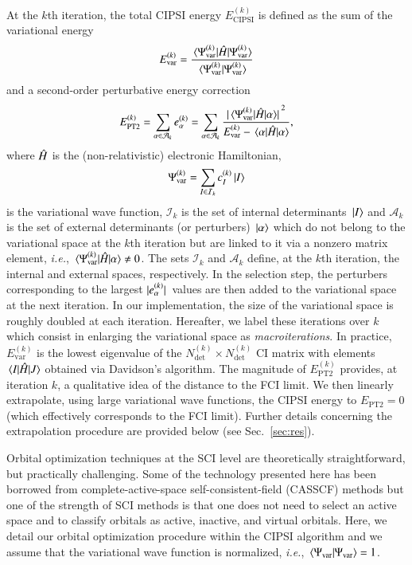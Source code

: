 \documentclass[aip,jcp,reprint,noshowkeys,superscriptaddress,floatfix]{revtex4-1}
\newcommand{\ie}{\textit{i.e.}}
\newcommand{\Ndet}{N_\text{det}}
\newcommand{\hH}{\Hat{H}}
\newcommand{\cA}{\mathcal{A}}
\newcommand{\cI}{\mathcal{I}}
\newcommand{\Evar}{E_\text{var}}
\newcommand{\EPT}{E_\text{PT2}}
\newcommand{\ECIPSI}{E_\text{CIPSI}}
\newcommand{\Psivar}{\Psi_\text{var}}
\begin{document}
At the $k$th iteration, the total CIPSI energy $\ECIPSI^{(k)}$ is defined as the sum of the variational energy
\begin{equation}
	\Evar^{(k)} = \frac{\mel*{\Psivar^{(k)}}{\hH}{\Psivar^{(k)}}}{\braket*{\Psivar^{(k)}}{\Psivar^{(k)}}}
\end{equation}
and a second-order perturbative energy correction
\begin{equation}
	\EPT^{(k)}
	= \sum_{\alpha \in \cA_k} e_{\alpha}^{(k)}
	= \sum_{\alpha \in \cA_k} \frac{\abs*{\mel*{\Psivar^{(k)}}{\hH}{\alpha}}^2}{\Evar^{(k)} - \mel*{\alpha}{\hH}{\alpha}},
\end{equation}
where $\hH$ is the (non-relativistic) electronic Hamiltonian,
\begin{equation}
\label{eq:Psivar}
	\Psivar^{(k)} = \sum_{I \in \cI_k} c_I^{(k)} \ket*{I}
\end{equation}
is the variational wave function, $\cI_k$ is the set of internal determinants $\ket*{I}$ and $\cA_k$ is the set of external determinants (or perturbers) $\ket*{\alpha}$ which do not belong to the variational space at the $k$th iteration but are linked to it via a nonzero matrix element, \ie, $\mel*{\Psivar^{(k)}}{\hH}{\alpha} \neq 0$.
The sets $\cI_k$ and $\cA_k$ define, at the $k$th iteration, the internal and external spaces, respectively.
In the selection step, the perturbers corresponding to the largest $\abs*{e_{\alpha}^{(k)}}$ values are then added to the variational space at the next iteration.
In our implementation, the size of the variational space is roughly doubled at each iteration.
Hereafter, we label these iterations over $k$ which consist in enlarging the variational space as \textit{macroiterations}.
In practice, $\Evar^{(k)}$ is the lowest eigenvalue of the $\Ndet^{(k)} \times \Ndet^{(k)}$ CI matrix with elements $\mel{I}{\hH}{J}$ obtained via Davidson's algorithm. \cite{Davidson_1975}
The magnitude of $\EPT^{(k)}$ provides, at iteration $k$, a qualitative idea of the distance to the FCI limit. \cite{Garniron_2018}
We then linearly extrapolate, using large variational wave functions, the CIPSI energy to $\EPT = 0$ (which effectively corresponds to the FCI limit).
Further details concerning the extrapolation procedure are provided below (see Sec.~\ref{sec:res}).

Orbital optimization techniques at the SCI level are theoretically straightforward, but practically challenging.
Some of the technology presented here has been borrowed from complete-active-space self-consistent-field (CASSCF) methods \cite{Werner_1980,Werner_1985,Sun_2017,Kreplin_2019,Kreplin_2020} but one of the strength of SCI methods is that one does not need to select an active space and to classify orbitals as active, inactive, and virtual orbitals.
Here, we detail our orbital optimization procedure within the CIPSI algorithm and we assume that the variational wave function is normalized, \ie, $\braket*{\Psivar}{\Psivar} = 1$.
\end{document}
